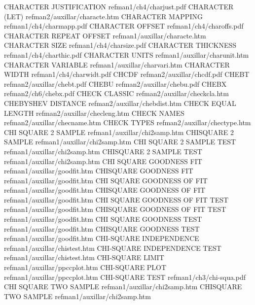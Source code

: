 CHARACTER JUSTIFICATION                 refman1/ch4/charjust.pdf
CHARACTER (LET)                         refman2/auxillar/characte.htm
CHARACTER MAPPING                       refman1/ch4/charmapp.pdf
CHARACTER OFFSET                        refman1/ch4/charoffs.pdf
CHARACTER REPEAT OFFSET                 refman1/auxillar/characte.htm
CHARACTER SIZE                          refman1/ch4/charsize.pdf
CHARACTER THICKNESS                     refman1/ch4/charthic.pdf
CHARACTER UNITS                         refman1/auxillar/charunit.htm
CHARACTER VARIABLE                      refman1/auxillar/charvari.htm
CHARACTER WIDTH                         refman1/ch4/charwidt.pdf
CHCDF                                   refman2/auxillar/chcdf.pdf
CHEBT                                   refman2/auxillar/chebt.pdf
CHEBU                                   refman2/auxillar/chebu.pdf
CHEBX                                   refman2/ch6/chebx.pdf
CHECK CLASSIC                           refman2/auxillar/checkcla.htm
CHEBYSHEV DISTANCE                      refman2/auxillar/chebdist.htm
CHECK EQUAL LENGTH                      refman2/auxillar/checleng.htm
CHECK NAMES                             refman2/auxillar/checname.htm
CHECK TYPES                             refman2/auxillar/chectype.htm
CHI SQUARE 2 SAMPLE                     refman1/auxillar/chi2samp.htm
CHISQUARE 2 SAMPLE                      refman1/auxillar/chi2samp.htm
CHI SQUARE 2 SAMPLE TEST                refman1/auxillar/chi2samp.htm
CHISQUARE 2 SAMPLE TEST                 refman1/auxillar/chi2samp.htm
CHI SQUARE GOODNESS FIT                 refman1/auxillar/goodfit.htm
CHISQUARE GOODNESS FIT                  refman1/auxillar/goodfit.htm
CHI SQUARE GOODNESS OF FIT              refman1/auxillar/goodfit.htm
CHISQUARE GOODNESS OF FIT               refman1/auxillar/goodfit.htm
CHI SQUARE GOODNESS OF FIT TEST         refman1/auxillar/goodfit.htm
CHISQUARE GOODNESS OF FIT TEST          refman1/auxillar/goodfit.htm
CHI SQUARE GOODNESS TEST                refman1/auxillar/goodfit.htm
CHISQUARE GOODNESS TEST                 refman1/auxillar/goodfit.htm
CHI-SQUARE INDEPENDENCE                 refman1/auxillar/chistest.htm
CHI-SQUARE INDEPENDENCE TEST            refman1/auxillar/chistest.htm
CHI-SQUARE LIMIT                        refman1/auxillar/ppccplot.htm
CHI-SQUARE PLOT                         refman1/auxillar/ppccplot.htm
CHI-SQUARE TEST                         refman1/ch3/chi-squa.pdf
CHI SQUARE TWO SAMPLE                   refman1/auxillar/chi2samp.htm
CHISQUARE TWO SAMPLE                    refman1/auxillar/chi2samp.htm
